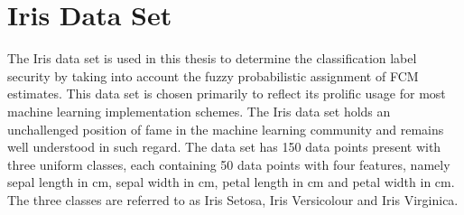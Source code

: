 \documentclass[english]{HSMW-Thesis}
\begin{document}
\section{Iris Data Set}
The Iris data set\cite{fisher1936use} is used in this thesis to determine the classification label security by taking into account the fuzzy probabilistic assignment of FCM estimates. This data set is chosen primarily to reflect its prolific usage for most machine learning implementation schemes. The Iris data set holds an unchallenged position of fame in the machine learning community and remains well understood in such regard. The data set has 150 data points present with three uniform classes, each containing 50 data points with four features, namely sepal length in cm, sepal width in cm, petal length in cm and petal width in cm. The three classes are referred to as Iris Setosa, Iris Versicolour and Iris Virginica.
\end{document}
